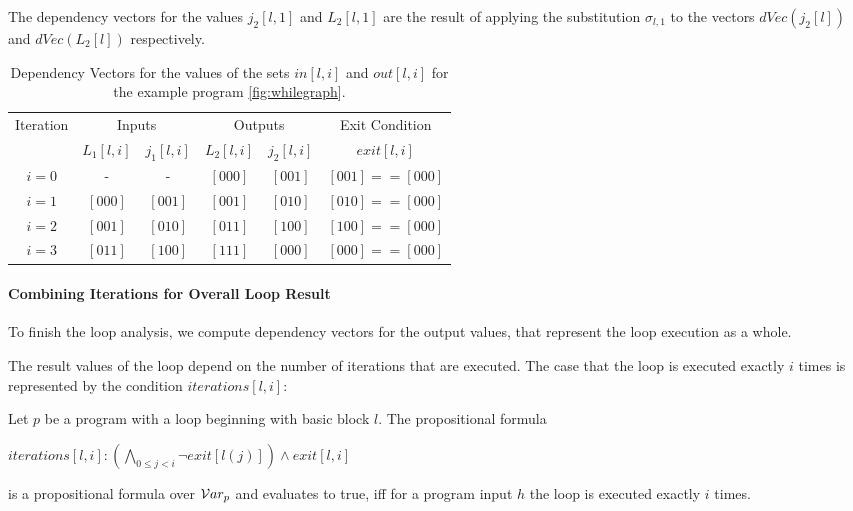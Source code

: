 The dependency vectors for the values $j_2[l, 1]$ and $L_2[l, 1]$ are the result of applying the substitution $\sigma_{l, 1}$ to the vectors $dVec(j_2[l])$ and $dVec(L_2[l])$ respectively.

\begin{table}
    \centering
    \begin{tabular}{|c|c|c|c|c|c|}
    Iteration & \multicolumn{2}{|c|}{Inputs} & \multicolumn{2}{|c|}{Outputs} & Exit Condition \\
     & $L_1[l, i]$ & $j_1[l, i]$ & $L_2[l, i]$ & $j_2[l, i]$ & $exit[l, i]$ \\
     \hline
     $i = 0$ & - & - & $[0 0 0]$ & $[0 0 1]$ & $[001] == [000]$ \\
     $i = 1$ & $[0 0 0]$ & $[0 0 1]$ & $[0 0 1]$ & $[0 1 0]$ & $[010] == [000]$ \\
     $i = 2$ & $[0 0 1]$ & $[0 1 0]$ & $[0 1 1]$ & $[1 0 0]$ & $[100] == [000]$ \\
     $i = 3$ & $[0 1 1]$ & $[1 0 0]$ & $[1 1 1]$ & $[0 0 0]$ & $[000] == [000]$ \\
    \end{tabular}
    \caption{Dependency Vectors for the values of the sets $in[l, i]$ and $out[l, i]$ for the example program \ref{fig:whilegraph}.}
    \label{tab:loop}
\end{table}

\paragraph{Combining Iterations for Overall Loop Result}
To finish the loop analysis, we compute dependency vectors for the output values, that represent the loop execution as a whole.

The result values of the loop depend on the number of iterations that are executed. The case that the loop is executed exactly $i$ times is represented by the condition $iterations[l, i]$:

\begin{definition}
    Let $p$ be a program with a loop beginning with basic block $l$.
    The propositional formula
    \begin{center}
        $iterations[l, i]: (\bigwedge\limits_{0 \leq j < i} \lnot exit[l(j)]) \land exit[l, i]$
    \end{center}
    is a propositional formula over $\mathcal{V}ar_p$ and evaluates to true, iff for a program input $h$ the loop is executed exactly $i$ times.
\end{definition}

